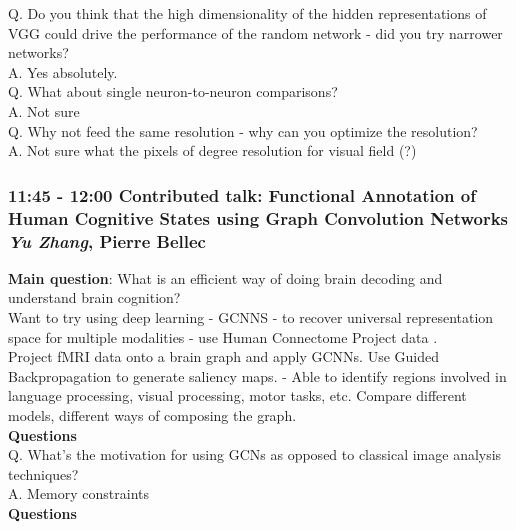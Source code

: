 \documentclass[12pt]{article}
\begin{document}
Q. Do you think that the high dimensionality of the hidden representations of VGG could drive the performance of the random network - did you try narrower networks? \\

A. Yes absolutely. \\

Q. What about single neuron-to-neuron comparisons? \\

A. Not sure \\

Q. Why not feed the same resolution - why can you optimize the resolution? \\

A. Not sure what the pixels of degree resolution for visual field (?)


\subsubsection{11:45 - 12:00 Contributed talk:  Functional Annotation of Human Cognitive States using Graph Convolution Networks \textit{Yu Zhang}, Pierre Bellec}

\textbf{Main question}: What is an efficient way of doing brain decoding and understand brain cognition? \\

Want to try using deep learning - GCNNS - to recover universal representation space for multiple modalities - use Human Connectome Project data \cite{Hughes2016}. \\

Project fMRI data onto a brain graph and apply GCNNs. Use Guided Backpropagation to generate saliency maps. - Able to identify regions involved in language processing, visual processing, motor tasks, etc. Compare different models, different ways of composing the graph. \\

\textbf{Questions} \\ 

Q. What's the motivation for using GCNs as opposed to classical image analysis techniques? \\

A. Memory constraints \\

\textbf{Questions} 

\end{document}
